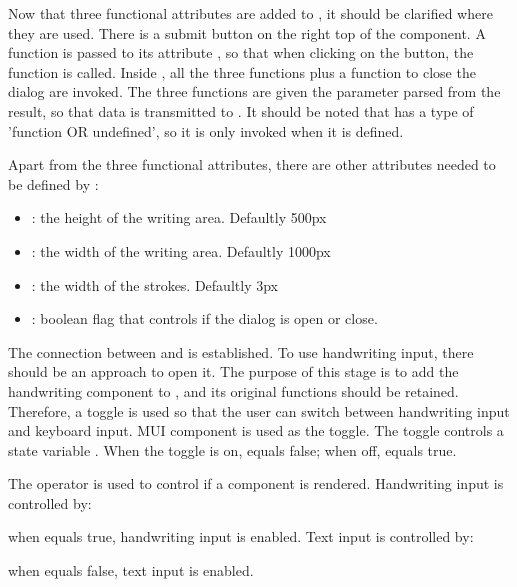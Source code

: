 \documentclass[12pt,twoside]{report}
\begin{document}
Now that three functional attributes are added to , it
should be clarified where they are used. There is a submit button on the right
top of the component. A function  is passed to its attribute
, so that when clicking on the button, the function is called.
Inside , all the three functions plus a function to close the
dialog are invoked. The three functions are given the parameter
 parsed from the result, so that data is transmitted to
. It should be noted that  has a type
of 'function OR undefined', so it is only invoked when it is defined.

Apart from the three functional attributes, there are other attributes needed to be defined by :
\begin{itemize}
    \item {}: the height of the writing area. Defaultly 500px
    \item {}: the width of the writing area. Defaultly 1000px
    \item {}: the width of the strokes. Defaultly 3px
    \item {}: boolean flag that controls if the dialog is open or close.
\end{itemize}

The connection between  and  is
established. To use handwriting input, there should be an approach to open it.
The purpose of this stage is to add the handwriting component to
, and its original functions should be retained.
Therefore, a toggle is used so that the user can switch between handwriting
input and keyboard input. MUI component  is used as the toggle. The toggle controls a state variable . When the toggle is on,  equals false; when off,  equals true.

The \code{\&\&} operator is used to control if a component is rendered. Handwriting input is controlled by: 

\centerline{} 

when  equals true, handwriting input is enabled. Text input is controlled by: 

\centerline{}

when  equals false, text input is enabled.
\end{document}
